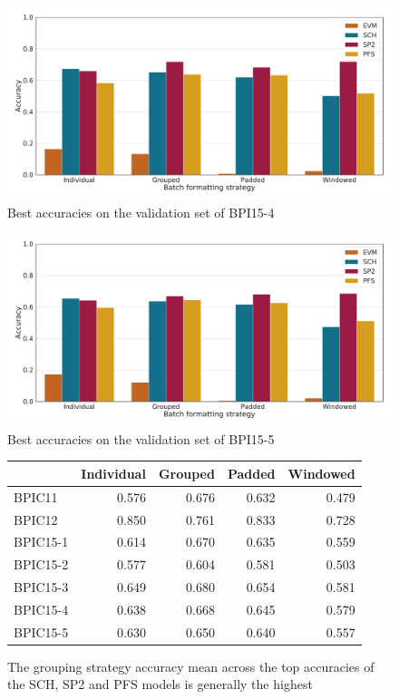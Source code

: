 \begin{figure}
    \centering
    \includegraphics[width=\textwidth]{gfx/bpic2015_4/accuracies.pdf}
    \caption{Best accuracies on the validation set of BPI15-4}
    \label{fig:max-accuracies-bpic2015-4}
\end{figure}
\begin{figure}
    \centering
    \includegraphics[width=\textwidth]{gfx/bpic2015_5/accuracies.pdf}
    \caption{Best accuracies on the validation set of BPI15-5}
    \label{fig:max-accuracies-bpic2015-5}
\end{figure}
\begin{figure}
\centering
\begin{tabular}{l|rrrr}
&  Individual &   Grouped &    Padded &  Windowed \\
\midrule
BPIC11   &    0.576    &  0.676    &  0.632    &  0.479    \\
BPIC12   &    0.850    &  0.761    &  0.833    &  0.728    \\
BPIC15-1 &    0.614    &  0.670    &  0.635    &  0.559    \\
BPIC15-2 &    0.577    &  0.604    &  0.581    &  0.503    \\
BPIC15-3 &    0.649    &  0.680    &  0.654    &  0.581    \\
BPIC15-4 &    0.638    &  0.668    &  0.645    &  0.579    \\
BPIC15-5 &    0.630    &  0.650    &  0.640    &  0.557    \\
\end{tabular}
\caption[Grouping strategy leads to best mean accuracies]{The grouping strategy accuracy mean across the top accuracies of the SCH, SP2 and PFS models is generally the highest}
\label{tab:strategy-top-accuracies}
\end{figure}
\FloatBarrier

